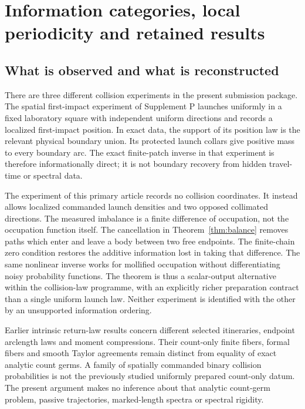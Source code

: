 \section{Information categories, local periodicity and retained results}
\label{sec:comparison}
\subsection{What is observed and what is reconstructed}
There are three different collision experiments in the present submission
package. The spatial first-impact experiment of Supplement P launches
uniformly in a fixed laboratory square with independent uniform directions
and records a localized first-impact position. In exact data, the support
of its position law is the relevant physical boundary union. Its protected
launch collars give positive mass to every boundary arc. The exact
finite-patch inverse in that experiment is therefore informationally
direct; it is not boundary recovery from hidden travel-time or spectral
data.

The experiment of this primary article records no collision coordinates.
It instead allows localized commanded launch densities and two opposed
collimated directions. The measured imbalance is a finite difference
of occupation, not the occupation function itself. The cancellation in
Theorem~\ref{thm:balance} removes paths which enter and leave a body
between two free endpoints. The finite-chain zero condition restores
the additive information lost in taking that difference. The same
nonlinear inverse works for mollified occupation without differentiating
noisy probability functions. The theorem is thus a scalar-output
alternative within the collision-law programme, with an explicitly
richer preparation contract than a single uniform launch law. Neither
experiment is identified with the other by an unsupported information
ordering.

Earlier intrinsic return-law results concern different selected
itineraries, endpoint arclength laws and moment compressions. Their
count-only finite fibers, formal fibers and smooth Taylor agreements
remain distinct from equality of exact analytic count germs. A family
of spatially commanded binary collision probabilities is not the
previously studied uniformly prepared count-only datum. The present
argument makes no inference about that analytic count-germ problem,
passive trajectories, marked-length spectra or spectral rigidity.

